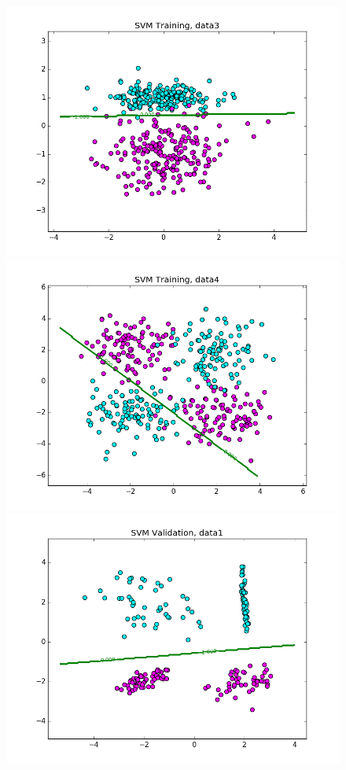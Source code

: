 \documentclass{article}
\begin{document}
\begin{figure}[width=\linewidth]
\begin{multicols}{2}
  \includegraphics[width=1.2\linewidth]{code/P2/data3,training.png}
  \includegraphics[width=1.2\linewidth]{code/P2/data4,training.png}
  \includegraphics[width=1.2\linewidth]{code/P2/data1,validation.png}

\end{multicols}
\end{figure}
\end{document}
